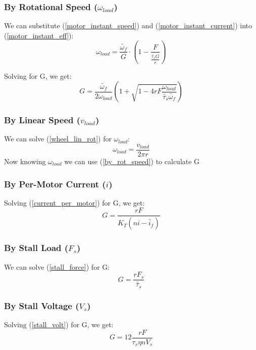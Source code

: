 \documentclass[11pt,a4paper,titlepage]{article}
\begin{document}
	
	\subsubsection{By Rotational Speed ($\omega_{load}$)}
	We can substitute (\ref{motor_instant_speed}) and (\ref{motor_instant_current}) into (\ref{motor_instant_eff}):
	\begin{equation}
	\omega_{load} = \frac{\tilde{\omega_f}}{G} \cdot (1 - \frac{F}{\frac{\tilde{\tau_s} G}{r}})
	\end{equation}
	
	Solving for G, we get:
	\begin{equation} \label{by_rot_speed}
		G = \frac{\tilde{\omega_f}}{2 \omega_{load}} \left( 1 + \sqrt{1 - 4 r F \frac{\omega_{load}}{\tilde{\tau_s} \tilde{\omega_f}}} \right)
	\end{equation}
	
	\subsubsection{By Linear Speed ($v_{load}$)}
	We can solve (\ref{wheel_lin_rot}) for $\omega_{load}$:
	\begin{equation}
		\omega_{load} = \frac{v_{load}}{2 \pi r}
	\end{equation}
	Now knowing $\omega_{load}$ we can use (\ref{by_rot_speed}) to calculate G
	
	\subsubsection{By Per-Motor Current ($i$)}
	Solving (\ref{current_per_motor}) for G, we get:
	\begin{equation}
		G = \frac{r F}{K_T (n i - \tilde{i_f})}
	\end{equation}
	
	\subsubsection{By Stall Load ($F_s$)}
	We can solve (\ref{stall_force}) for G:
	\begin{equation}
		G = \frac{r F_s}{\tilde{\tau_s}}
	\end{equation}
	
	\subsubsection{By Stall Voltage ($V_s$)}
	Solving (\ref{stall_volt}) for G, we get:
	\begin{equation}
		G = 12 \frac{r F}{\tau_s \eta n V_s}
	\end{equation}
	
\end{document}
